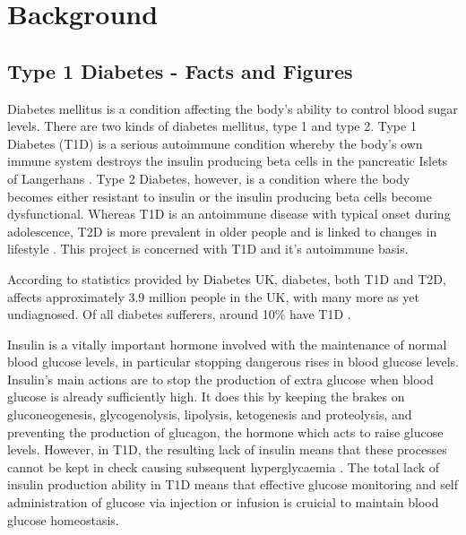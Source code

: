 
\chapter{Background}


\section{Type 1 Diabetes - Facts and Figures}
\label{sec:sectionLabel}


Diabetes mellitus is a condition affecting the body's ability to control blood sugar levels.
There are two kinds of diabetes mellitus, type 1 and type 2.
Type 1 Diabetes (T1D) is a serious autoimmune condition whereby the body's own immune system destroys the insulin producing beta cells in the pancreatic Islets of Langerhans \citep{Daneman2006}.
Type 2 Diabetes, however, is a condition where the body becomes either resistant to insulin or the insulin producing beta cells become dysfunctional.
Whereas T1D is an antoimmune disease with typical onset during adolescence, T2D is more prevalent in older people and is linked to changes in lifestyle \citep{OxClinMed}.
This project is concerned with T1D and it's autoimmune basis.

According to statistics provided by Diabetes UK, diabetes, both T1D and T2D, affects approximately 3.9 million people in the UK, with many more as yet undiagnosed. 
Of all diabetes sufferers, around 10\% have T1D .

Insulin is a vitally important hormone involved with the maintenance of normal blood glucose levels, in particular stopping dangerous rises in blood glucose levels.
Insulin's main actions are to stop the production of extra glucose when blood glucose is already sufficiently high.
It does this by keeping the brakes on gluconeogenesis, glycogenolysis, lipolysis, ketogenesis and proteolysis, and preventing the production of glucagon, the hormone which acts to raise glucose levels.
However, in T1D, the resulting lack of insulin means that these processes cannot be kept in check causing subsequent hyperglycaemia \citep{Sonksen2000}.
The total lack of insulin production ability in T1D means that effective glucose monitoring and self administration of glucose via injection or infusion is cruicial to maintain blood glucose homeostasis.

